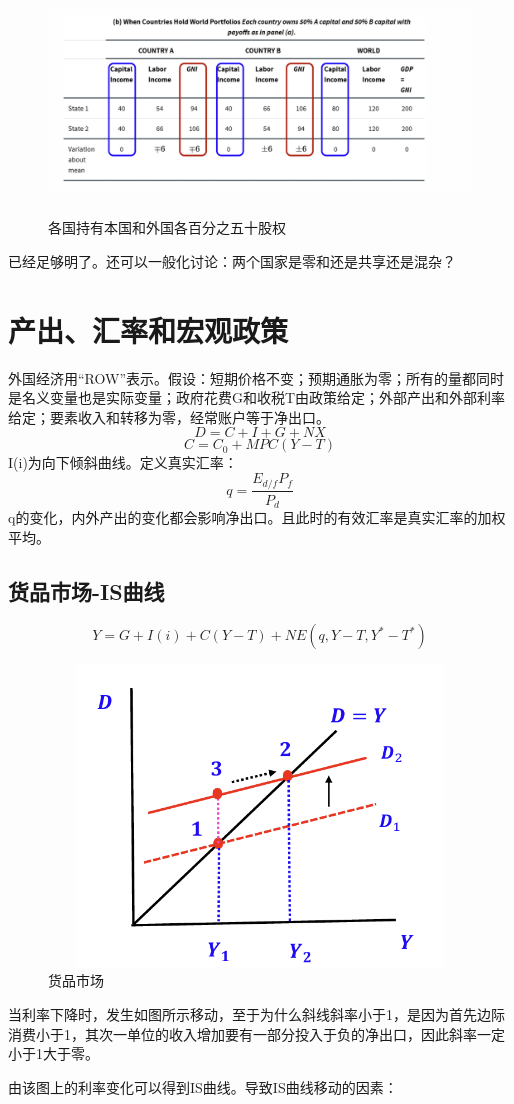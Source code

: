 \documentclass[a4paper, 10pt]{article}
\begin{document}
\begin{figure}[h]
  \centering 
  \includegraphics[height=6.0cm,width=12.0cm]{pic3.png}
  
  \caption{各国持有本国和外国各百分之五十股权}
  \label{3}
  
  \end{figure}
已经足够明了。还可以一般化讨论：两个国家是零和还是共享还是混杂？
\section{产出、汇率和宏观政策}
\noindent 外国经济用“ROW”表示。假设：短期价格不变；预期通胀为零；所有的量都同时是名义变量也是实际变量；政府花费G和收税T由政策给定；外部产出和外部利率给定；要素收入和转移为零，经常账户等于净出口。
$$D=C+I+G+NX$$
$$C=C_0+MPC(Y-T)$$
I(i)为向下倾斜曲线。定义真实汇率：
$$q=\frac{E_{d/f}P_f}{P_d}$$
q的变化，内外产出的变化都会影响净出口。且此时的有效汇率是真实汇率的加权平均。

\subsection{货品市场-IS曲线}
$$Y=G+I(i)+C(Y-T)+NE(q,Y-T,Y^*-T^*)$$
\begin{figure}[h]
  \centering 
  \includegraphics[height=8.0cm,width=12.0cm]{pic4.png}
  
  \caption{货品市场}
  \label{4}
  
  \end{figure}

\noindent 当利率下降时，发生如图所示移动，至于为什么斜线斜率小于1，是因为首先边际消费小于1，其次一单位的收入增加要有一部分投入于负的净出口，因此斜率一定小于1大于零。

\noindent 由该图上的利率变化可以得到IS曲线。导致IS曲线移动的因素：
\end{document}
